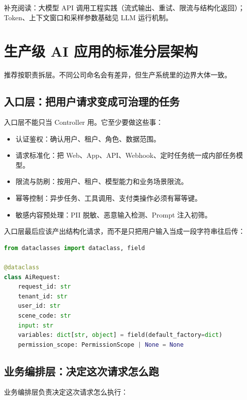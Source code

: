 \documentclass[9pt,a4paper,twocolumn]{ctexart}
\begin{document}
补充阅读：大模型 API 调用工程实践（流式输出、重试、限流与结构化返回）；Token、上下文窗口和采样参数基础见 LLM 运行机制。



\section*{生产级 AI 应用的标准分层架构}


推荐按职责拆层。不同公司命名会有差异，但生产系统里的边界大体一致。



\subsection*{入口层：把用户请求变成可治理的任务}


入口层不能只当 Controller 用。它至少要做这些事：


\begin{itemize}[itemsep=1pt, topsep=2pt]
  \item 认证鉴权：确认用户、租户、角色、数据范围。
  \item 请求标准化：把 Web、App、API、Webhook、定时任务统一成内部任务模型。
  \item 限流与防刷：按用户、租户、模型能力和业务场景限流。
  \item 幂等控制：异步任务、工具调用、支付类操作必须有幂等键。
  \item 敏感内容预处理：PII 脱敏、恶意输入检测、Prompt 注入初筛。
\end{itemize}


入口层最后应该产出结构化请求，而不是只把用户输入当成一段字符串往后传：



\begin{lstlisting}[language=Python]
from dataclasses import dataclass, field

@dataclass
class AiRequest:
    request_id: str
    tenant_id: str
    user_id: str
    scene_code: str
    input: str
    variables: dict[str, object] = field(default_factory=dict)
    permission_scope: PermissionScope | None = None
\end{lstlisting}



\subsection*{业务编排层：决定这次请求怎么跑}


业务编排层负责决定这次请求怎么执行：
\end{document}
